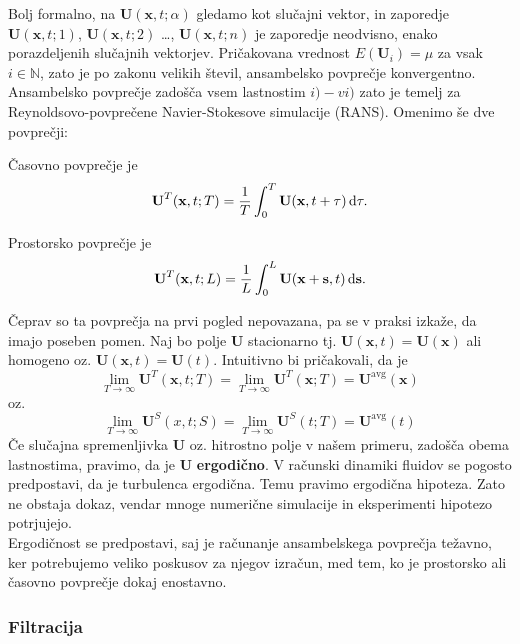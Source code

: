 \documentclass[mat2, tisk]{fmfdelo}
\newcommand{\N}{\mathbb N}
\newcommand{\bd}{\textbf}
\begin{document}
Bolj formalno, na $\bd{U}(\bd{x}, t;\alpha)$ gledamo kot slučajni vektor, in zaporedje 
$\bd{U}(\bd{x}, t; 1)$, $\bd{U}(\bd{x}, t; 2)$ \dots, $\bd{U}(\bd{x}, t;n)$ je zaporedje neodvisno, enako porazdeljenih 
slučajnih vektorjev. Pričakovana vrednost $E(\bd{U}_i) = \mu$ za vsak $i\in\N$, zato je po 
zakonu velikih števil, ansambelsko povprečje konvergentno.\\

Ansambelsko povprečje zadošča vsem lastnostim $i) - vi)$ zato je temelj za \\
Reynoldsovo-povprečene Navier-Stokesove simulacije (RANS). Omenimo še dve povprečji: 
\begin{definicija}
Časovno povprečje je 
\begin{equation}
\bd{U}^T(\bd{x}, t; T) = \frac{1}{T}\int_0^T \bd{U}(\bd{x}, t + \tau) \dif \tau.
\end{equation}
\end{definicija}

\begin{definicija}
Prostorsko povprečje je 
\begin{equation}
\bd{U}^T(\bd{x}, t; L) = \frac{1}{L}\int_0^L \bd{U}(\bd{x} + \bd{s}, t) \dif \bd{s}.
\end{equation}
\end{definicija}

Čeprav so ta povprečja na prvi pogled nepovazana, pa se v praksi izkaže, da imajo poseben 
pomen. Naj bo polje $\bd{U}$ stacionarno tj. $\bd{U}(\bd{x}, t) = \bd{U}(\bd{x})$ ali homogeno oz. $\bd{U}(\bd{x}, t) = \bd{U}(t)$.
Intuitivno bi pričakovali, da je 
$$
\lim_{T\rightarrow \infty} \bd{U}^T(\bd{x}, t; T) = \lim_{T\rightarrow \infty} \bd{U}^T(\bd{x}; T) = \bd{U}^\text{avg}(\bd{x})
$$
oz. 
$$
\lim_{T\rightarrow \infty} \bd{U}^S(x, t; S) = \lim_{T\rightarrow \infty} \bd{U}^S(t; T) = \bd{U}^\text{avg}(t)
$$
Če slučajna spremenljivka $\bd{U}$ oz. hitrostno polje v našem primeru, zadošča obema lastnostima, 
pravimo, da je $\bd{U}$ \textbf{ergodično}. V računski dinamiki fluidov se pogosto predpostavi, da je turbulenca ergodična. 
Temu pravimo ergodična hipoteza. Zato ne obstaja dokaz, vendar mnoge numerične simulacije in eksperimenti hipotezo potrjujejo. \\
Ergodičnost se predpostavi, saj je računanje ansambelskega povprečja težavno, ker potrebujemo 
veliko poskusov za njegov izračun, med tem, ko je prostorsko ali časovno povprečje dokaj 
enostavno.

\subsubsection{Filtracija}
\end{document}
